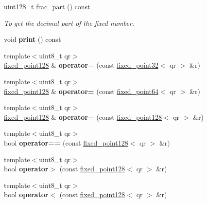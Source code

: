 \begin{DoxyCompactItemize}
uint128\+\_\+t \mbox{\hyperlink{structaacio_1_1fixed__point128_a8bc9ccd0701b48ce4642a833d8536406}{frac\+\_\+part}} () const
\begin{DoxyCompactList}\small\item\em To get the decimal part of the fixed number. \end{DoxyCompactList}\item 
\mbox{\label{structaacio_1_1fixed__point128_a1236b47836dba2cb4ead5ae84fc9d15c}} 
void {\bfseries print} () const
\item 
\mbox{\label{structaacio_1_1fixed__point128_a4c5853271be8c656293594ffb482c537}} 
{\footnotesize template$<$uint8\+\_\+t qr$>$ }\\\mbox{\hyperlink{structaacio_1_1fixed__point128}{fixed\+\_\+point128}} \& {\bfseries operator=} (const \mbox{\hyperlink{structaacio_1_1fixed__point32}{fixed\+\_\+point32}}$<$ qr $>$ \&r)
\item 
\mbox{\label{structaacio_1_1fixed__point128_afb3705e22faabf50391818085d1b410b}} 
{\footnotesize template$<$uint8\+\_\+t qr$>$ }\\\mbox{\hyperlink{structaacio_1_1fixed__point128}{fixed\+\_\+point128}} \& {\bfseries operator=} (const \mbox{\hyperlink{structaacio_1_1fixed__point64}{fixed\+\_\+point64}}$<$ qr $>$ \&r)
\item 
\mbox{\label{structaacio_1_1fixed__point128_aeb203cf7d37e0e9d17ba61db195dadea}} 
{\footnotesize template$<$uint8\+\_\+t qr$>$ }\\\mbox{\hyperlink{structaacio_1_1fixed__point128}{fixed\+\_\+point128}} \& {\bfseries operator=} (const \mbox{\hyperlink{structaacio_1_1fixed__point128}{fixed\+\_\+point128}}$<$ qr $>$ \&r)
\item 
\mbox{\label{structaacio_1_1fixed__point128_ac35fe24af9c540b61afa1be950d50c25}} 
{\footnotesize template$<$uint8\+\_\+t qr$>$ }\\bool {\bfseries operator==} (const \mbox{\hyperlink{structaacio_1_1fixed__point128}{fixed\+\_\+point128}}$<$ qr $>$ \&r)
\item 
\mbox{\label{structaacio_1_1fixed__point128_ad82895b092f5c256d8e11e0feb846455}} 
{\footnotesize template$<$uint8\+\_\+t qr$>$ }\\bool {\bfseries operator$>$} (const \mbox{\hyperlink{structaacio_1_1fixed__point128}{fixed\+\_\+point128}}$<$ qr $>$ \&r)
\item 
\mbox{\label{structaacio_1_1fixed__point128_a485f72a80721eeb864fa2bf558ad7308}} 
{\footnotesize template$<$uint8\+\_\+t qr$>$ }\\bool {\bfseries operator$<$} (const \mbox{\hyperlink{structaacio_1_1fixed__point128}{fixed\+\_\+point128}}$<$ qr $>$ \&r)
\end{DoxyCompactItemize}
